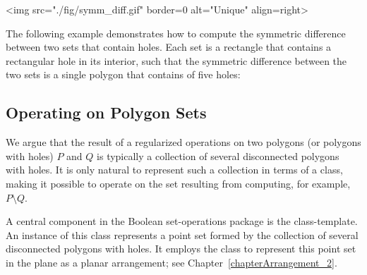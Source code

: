 \lcTex{%
  \setlength{\widthRight}{2.5cm}
  \setlength{\widthLeft}{\widthLineReal}
  \addtolength{\widthLeft}{-\widthRight}
  \begin{minipage}{\widthLeft}
}
\label{fig:sym_diff}
\begin{ccHtmlOnly}
  <img src="./fig/symm_diff.gif" border=0 alt="Unique" align=right>
\end{ccHtmlOnly}
The following example demonstrates how to compute the symmetric
difference between two sets that contain holes. Each set is a
rectangle that contains a rectangular hole in its interior, such that
the symmetric difference between the two sets is a single polygon that
contains of five holes:


\subsection{Operating on Polygon Sets}
\label{bops_ssec:main_component}

We argue that the result of a regularized operations on two polygons
(or polygons with holes) $P$ and $Q$ is typically a collection of
several disconnected polygons with holes. It is only natural to
represent such a collection in terms of a class, making it possible to
operate on the set resulting from computing, for example, $P \setminus
Q$.

A central component in the Boolean set-operations package is the
 class-template. An instance of this
class represents a point set formed by the collection of several disconnected
polygons with holes. It employs the  class to represent
this point set in the plane as a planar arrangement; see
Chapter~\ref{chapterArrangement_2}. 

